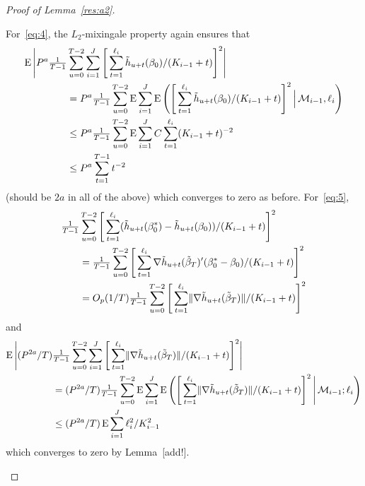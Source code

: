 \documentclass[12pt,fleqn]{article}
\begin{document}
\begin{proof}[Proof of Lemma~\ref{res:a2}]
\begin{enumerate}
    For~\eqref{eq:4}, the $L_2$-mixingale property again ensures that
    \begin{align*}
      \operatorname{E}\Bigg|P^a \tfrac{1}{T-1} &\sum_{u = 0}^{T-2} \sum_{i=1}^J \Bigg[\sum_{t = 1}^{\ell_{i}}
      \tilde{h}_{u + t}(\beta_0)/ (K_{i-1} + t)\Bigg]^2 \Bigg| \\
      &= P^a \tfrac{1}{T-1} \sum_{u = 0}^{T-2} \operatorname{E} \sum_{i=1}^J \operatorname{E}\Bigg(\Bigg[\sum_{t = 1}^{\ell_{i}}
      \tilde{h}_{u + t}(\beta_0)/ (K_{i-1} + t)\Bigg]^2 \,\Big|\, \mathcal{M}_{i-1}, \ell_i\Bigg) \\
      &\leq P^a \tfrac{1}{T-1} \sum_{u = 0}^{T-2} \operatorname{E} \sum_{i=1}^J C \sum_{t = 1}^{\ell_{i}} (K_{i-1} + t)^{-2} \\
      &\leq P^a \sum_{t=1}^{T-1} t^{-2}
    \end{align*}
    (should be $2a$ in all of the above)
    which converges to zero as before. For~\eqref{eq:5},
    \begin{align*}
      \tfrac{1}{T-1} &\sum_{u = 0}^{T-2} \Bigg[\sum_{t = 1}^{\ell_{i}}
      (\tilde{h}_{u + t}(\beta_0^*) - \tilde{h}_{u + t}(\beta_0))/ (K_{i-1} + t)\Bigg]^2 \\
      &= \tfrac{1}{T-1} \sum_{u = 0}^{T-2} \Bigg[\sum_{t = 1}^{\ell_{i}}
      \nabla \tilde{h}_{u + t}(\tilde \beta_T)'(\beta_0^* - \beta_0)/ (K_{i-1} + t)\Bigg]^2 \\
      &= O_p(1/T) \tfrac{1}{T-1} \sum_{u = 0}^{T-2} \Bigg[\sum_{t = 1}^{\ell_{i}}
      \lVert \nabla \tilde{h}_{u + t}(\tilde \beta_T) \rVert / (K_{i-1} + t)\Bigg]^2
    \end{align*}
    and
    \begin{align*}
      \operatorname{E} \Bigg| (P^{2a}/T) &\tfrac{1}{T-1} \sum_{u = 0}^{T-2} \sum_{i=1}^J \Bigg[\sum_{t =
        1}^{\ell_{i}} \lVert \nabla \tilde{h}_{u + t}(\tilde \beta_T)
      \rVert / (K_{i-1} + t)\Bigg]^2 \Bigg| \\
      &= (P^{2a}/T) \tfrac{1}{T-1} \sum_{u = 0}^{T-2} \operatorname{E} \sum_{i=1}^J
      \operatorname{E} \Bigg(\Bigg[\sum_{t =
        1}^{\ell_{i}} \lVert \nabla \tilde{h}_{u + t}(\tilde \beta_T)
      \rVert / (K_{i-1} + t)\Bigg]^2 \,\Bigg|\, \mathcal{M}_{i-1}; \ell_i \Bigg) \\
      &\leq (P^{2a}/T) \operatorname{E} \sum_{i=1}^J \ell_i^2/K_{i-1}^2
    \end{align*}
    which converges to zero by Lemma~[add!].


\end{enumerate}
\end{proof}
\end{document}
